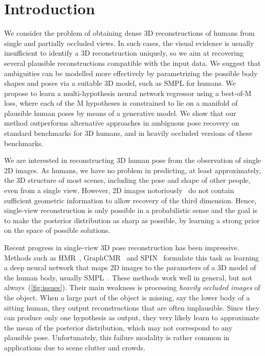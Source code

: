 \section{Introduction}\label{s:intro}

We consider the problem of obtaining dense 3D reconstructions of humans from single and partially occluded views.
In such cases, the visual evidence is usually insufficient to identify a 3D reconstruction uniquely, so we aim at recovering several plausible reconstructions compatible with the input data.
We suggest that ambiguities can be modelled more effectively by parametrizing the possible body shapes and poses via a suitable 3D model, such as SMPL for humans.
We propose to learn a multi-hypothesis neural network regressor using a best-of-M loss, where each of the M hypotheses is constrained to lie on a manifold of plausible human poses by means of a generative model.
We show that our method outperforms alternative approaches in ambiguous pose recovery on standard benchmarks for 3D humans, and in heavily occluded versions of these benchmarks.

We are interested in reconstructing 3D human pose from the observation of single 2D images.
As humans, we have no problem in predicting, at least approximately, the 3D structure of most scenes, including the pose and shape of other people, even from a single view.
However, 2D images notoriously~\citep{Faugeras01geometry} do not contain sufficient geometric information to allow recovery of the third dimension.
Hence, single-view reconstruction is only possible in a probabilistic sense and the goal is to make the posterior distribution as sharp as possible, by learning a strong prior on the space of possible solutions.

Recent progress in single-view 3D pose reconstruction has been impressive.
Methods such as HMR~\citep{kanazawa18end-to-end}, GraphCMR~\citep{kolotouros19convolutional} and SPIN~\citep{kolotouros19learning} formulate this task as learning a deep neural network that maps 2D images to the parameters of a 3D model of the human body, usually SMPL~\cite{loper15smpl}.
These methods work well in general, but not always~(\cref{fig:issues}).
Their main weakness is processing \emph{heavily occluded images} of the object.
When a large part of the object is missing, say the lower body of a sitting human, they output reconstructions that are often implausible.
Since they can produce only one hypothesis as output, they very likely learn to approximate the mean of the posterior distribution, which may not correspond to any plausible pose.
Unfortunately, this failure modality is rather common in applications due to scene clutter and crowds.

